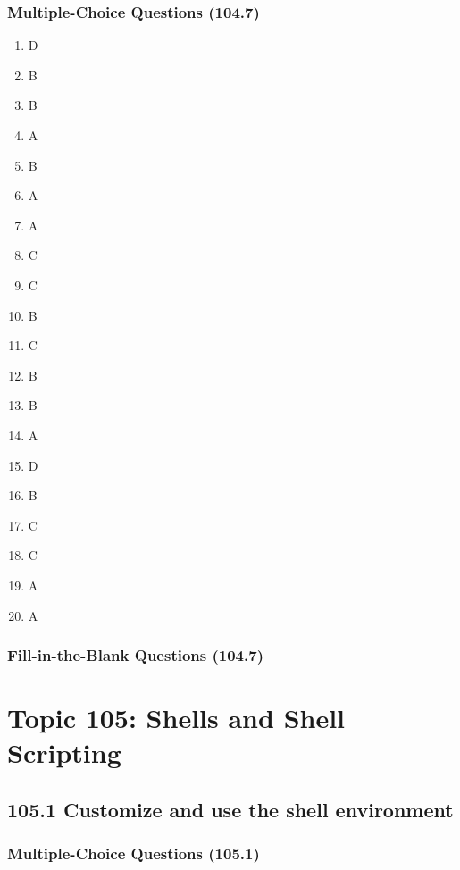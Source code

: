 \documentclass[a4paper]{report}
\begin{document}
\subsubsection*{Multiple-Choice Questions (104.7)}
\begin{enumerate}[1.]
    \item D
    \item B
    \item B
    \item A
    \item B
    \item A
    \item A
    \item C
    \item C
    \item B
    \item C
    \item B
    \item B
    \item A
    \item D
    \item B
    \item C
    \item C
    \item A
    \item A
\end{enumerate}
\subsubsection*{Fill-in-the-Blank Questions (104.7)}


\section*{Topic 105: Shells and Shell Scripting}

\subsection*{105.1 Customize and use the shell environment}
\subsubsection*{Multiple-Choice Questions (105.1)}
\end{document}
